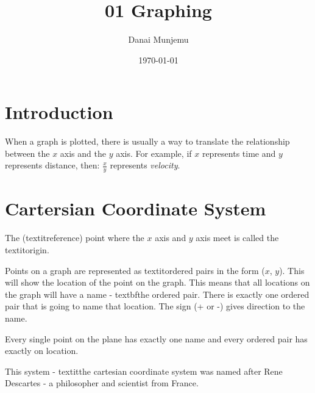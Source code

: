 \documentclass{article}
\title{01 Graphing}
\author{Danai Munjemu}
\date{\today}
\begin{document}
\maketitle %

\section{Introduction}
When a graph is plotted, there is usually a way to translate the relationship between the $x$ axis and the $y$ axis. For example, if $x$ represents time and $y$ represents distance, then:
$\frac{x}{y}$ represents \textit{velocity}.

\section{Cartersian Coordinate System}
The (textit{reference}) point where the $x$ axis and $y$ axis meet is called the textit{origin}.

Points on a graph are represented as textit{ordered pairs} in the form ($x$, $y$). This will show the location of the point on the graph. This means that all locations on the graph will have a name - textbf{the ordered pair}. There is exactly one ordered pair that is going to name that location.
The sign (+ or -) gives direction to the name.

Every single point on the plane has exactly one name and every ordered pair has exactly on location.

This system - textit{the cartesian coordinate system} was named after Rene Descartes - a philosopher and scientist from France.
\end{document}
